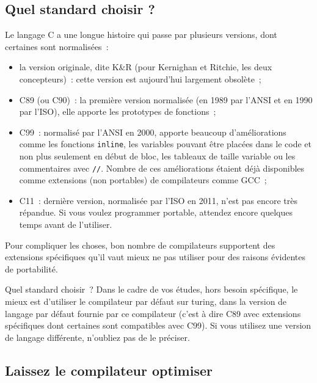 \documentclass {article}
\begin{document}
\subsection {Quel standard choisir ?}

Le langage C a une longue histoire qui passe par plusieurs versions,
dont certaines sont normalisées~:

\begin {itemize}
    \item la version originale, dite K\&R (pour Kernighan et Ritchie,
	les deux concepteurs)~: cette version est aujourd'hui largement
	obsolète~;

    \item C89 (ou C90)~: la première version normalisée (en 1989 par
	l'ANSI et en 1990 par l'ISO), elle apporte les prototypes de
	fonctions~;

    \item C99~: normalisé par l'ANSI en 2000, apporte beaucoup
	d'améliorations comme les fonctions \texttt {inline}, les
	variables pouvant être placées dans le code et non plus
	seulement en début de bloc, les tableaux de taille variable ou
	les commentaires avec \verb|//|. Nombre de ces améliorations
	étaient déjà disponibles comme extensions (non portables)
	de compilateurs comme GCC~;

    \item C11~: dernière version, normalisée par l'ISO en 2011, n'est
	pas encore très répandue. Si vous voulez programmer portable,
	attendez encore quelques temps avant de l'utiliser.

\end {itemize}

Pour compliquer les choses, bon nombre de compilateurs supportent des
extensions spécifiques qu'il vaut mieux ne pas utiliser pour des raisons
évidentes de portabilité.

Quel standard choisir~? Dans le cadre de vos études, hors besoin
spécifique, le mieux est d'utiliser le compilateur par défaut
sur turing, dans la version de langage par défaut fournie par ce
compilateur (c'est à dire C89 avec extensions spécifiques dont
certaines sont compatibles avec C99). Si vous utilisez une version de
langage différente, n'oubliez pas de le préciser.


\subsection {Laissez le compilateur optimiser}
\end{document}
